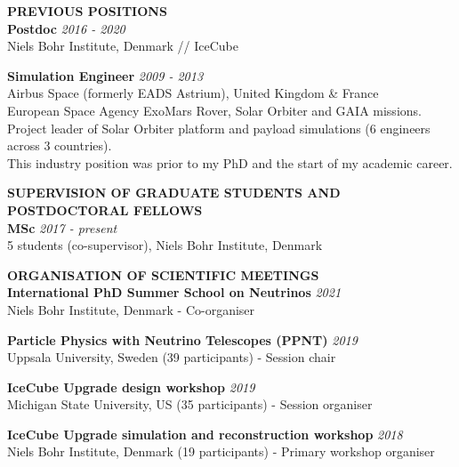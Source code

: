 \documentclass[a4paper,11pt]{article}
\renewcommand{\smallskip} {\vspace{0.1in}}
\begin{document}
\vspace{0.2cm}
\textbf{PREVIOUS POSITIONS ~~\hrulefill}\smallskip\\
%
{\bf Postdoc} \hfill {\em 2016 - 2020} \\ 
Niels Bohr Institute, Denmark // IceCube

{\bf Simulation Engineer} \hfill {\em 2009 - 2013} \\ 
Airbus Space (formerly EADS Astrium), United Kingdom \& France\\
European Space Agency ExoMars Rover, Solar Orbiter and GAIA missions. \\
Project leader of Solar Orbiter platform and payload simulations (6 engineers across 3 countries). \\
This industry position was prior to my PhD and the start of my academic career. 

\vspace{0.2cm}
\textbf{SUPERVISION OF GRADUATE STUDENTS AND POSTDOCTORAL FELLOWS ~~\hrulefill}\smallskip\\
%
{\bf MSc} \hfill {\em 2017 - present} \\
5 students (co-supervisor), Niels Bohr Institute, Denmark

\vspace{0.2cm}
\textbf{ORGANISATION OF SCIENTIFIC MEETINGS ~~\hrulefill}\smallskip\\
%
{\bf International PhD Summer School on Neutrinos} \hfill {\em 2021} \\ 
  Niels Bohr Institute, Denmark - Co-organiser
  
{\bf Particle Physics with Neutrino Telescopes (PPNT)} \hfill {\em 2019} \\ 
  Uppsala University, Sweden (39 participants) - Session chair
  
{\bf IceCube Upgrade design workshop} \hfill {\em 2019} \\ 
  Michigan State University, US (35 participants) - Session organiser

{\bf IceCube Upgrade simulation and reconstruction workshop} \hfill {\em 2018} \\ 
  Niels Bohr Institute, Denmark (19 participants) - Primary workshop organiser
\end{document}

